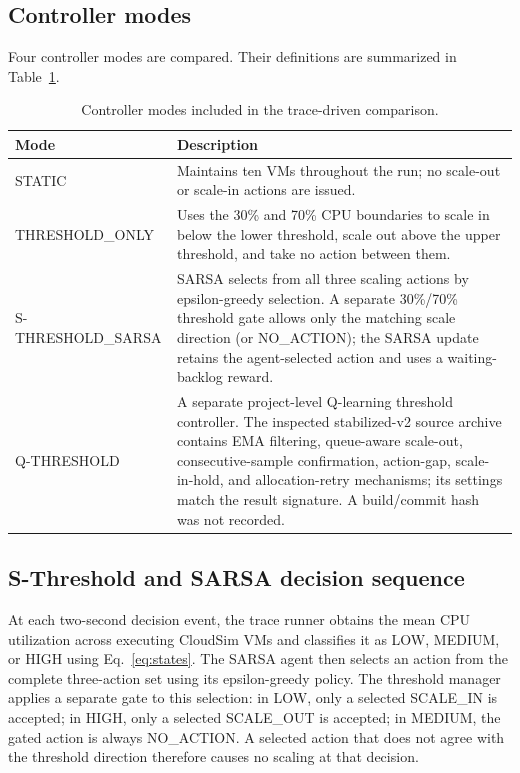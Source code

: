 \documentclass[pdflatex,sn-mathphys-num]{sn-jnl}
\begin{document}
\subsection{Controller modes}

Four controller modes are compared. Their definitions are summarized in Table~\ref{tab:modes}.

\begin{table}[t]
\caption{Controller modes included in the trace-driven comparison.}
\label{tab:modes}
\centering
\small
\begin{tabular}{p{}p{}}
\toprule
Mode & Description \\
\midrule
STATIC & Maintains ten VMs throughout the run; no scale-out or scale-in actions are issued. \\
THRESHOLD\_ONLY & Uses the 30\% and 70\% CPU boundaries to scale in below the lower threshold, scale out above the upper threshold, and take no action between them. \\
S-THRESHOLD\_\allowbreak SARSA & SARSA selects from all three scaling actions by epsilon-greedy selection. A separate 30\%/70\% threshold gate allows only the matching scale direction (or NO\_ACTION); the SARSA update retains the agent-selected action and uses a waiting-backlog reward. \\
Q-THRESHOLD & A separate project-level Q-learning threshold controller. The inspected stabilized-v2 source archive contains EMA filtering, queue-aware scale-out, consecutive-sample confirmation, action-gap, scale-in-hold, and allocation-retry mechanisms; its settings match the result signature. A build/commit hash was not recorded. \\
\bottomrule
\end{tabular}
\end{table}

\subsection{S-Threshold and SARSA decision sequence}\label{subsec:sarsa}

At each two-second decision event, the trace runner obtains the mean CPU utilization across executing CloudSim VMs and classifies it as LOW, MEDIUM, or HIGH using Eq.~\ref{eq:states}. The SARSA agent then selects an action from the complete three-action set using its epsilon-greedy policy. The threshold manager applies a separate gate to this selection: in LOW, only a selected SCALE\_IN is accepted; in HIGH, only a selected SCALE\_OUT is accepted; in MEDIUM, the gated action is always NO\_ACTION. A selected action that does not agree with the threshold direction therefore causes no scaling at that decision.
\end{document}

